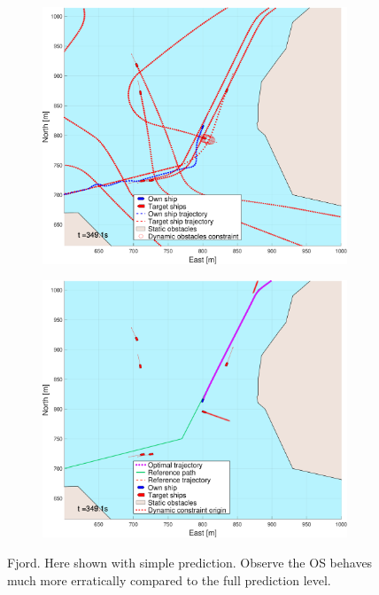 \begin{figure}[ht!]
\begin{subfigure}[b]{0.494\textwidth}
        \subcaption{}
    \end{subfigure}
    \hfill
    \\ 
    \begin{subfigure}[b]{0.494\textwidth}
        \centering
        \includegraphics[width=\textwidth]{Images/NewFigures/Trheimfjord/_Simple_1fig1_time=350}
        \subcaption{}
    \end{subfigure}
    \hfill
    \begin{subfigure}[b]{0.494\textwidth}
        \centering
        \includegraphics[width=\textwidth]{Images/NewFigures/Trheimfjord/_Simple_1fig999_time=350}
        \subcaption{}
    \end{subfigure}
    \hfill
    \caption{Fjord. Here shown with simple prediction. Observe the \gls{OS} behaves much more erratically compared to the full prediction level.}

\end{figure}


